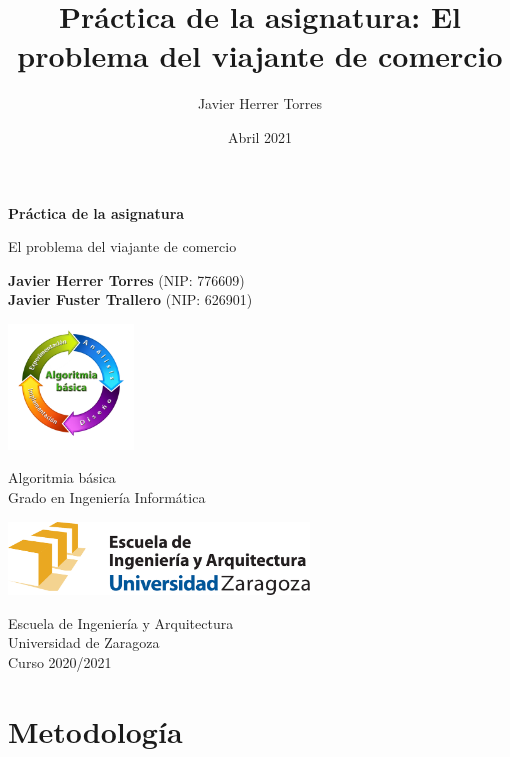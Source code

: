 \documentclass{article}
\title{Práctica de la asignatura: El problema del viajante de comercio}
\author{Javier Herrer Torres}
\date{Abril 2021}
\begin{document}
\begin{titlepage}
    \begin{center}
        \vspace*{1cm}
            
        \Huge
        \textbf{Práctica de la asignatura}
            
        \vspace{0.5cm}
        \LARGE
        El problema del viajante de comercio
            
        \vspace{1.5cm}

        \textbf{Javier Herrer Torres} (NIP: 776609)\\
        \textbf{Javier Fuster Trallero} (NIP: 626901)

        \vfill
        \includegraphics[width=0.25\textwidth]{../images/AB_logo_400x400}

        Algoritmia básica\\
        Grado en Ingeniería Informática\\
            
        \vspace{1.5cm}
            
        \includegraphics[width=0.6\textwidth]{../images/eina}
            
        \vspace{1.5cm}
            
        \Large
        Escuela de Ingeniería y Arquitectura\\
        Universidad de Zaragoza\\
        Curso 2020/2021
            
    \end{center}
\end{titlepage}

\section{Metodología}
\end{document}

